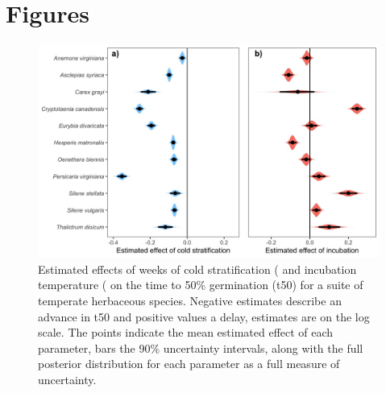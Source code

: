 \documentclass{article}[11pt]
\begin{document}
\section*{Figures}
\begin{figure}[h!]
    \centering
\includegraphics[width=\textwidth]{..//figure/mus_survival.jpeg}
   \caption{Estimated effects of weeks of cold stratification ( and incubation temperature ( on the time to 50\% germination (t50) for a suite of temperate herbaceous species. Negative estimates describe an advance in t50 and positive values a delay, estimates are on the log scale. The points indicate the mean estimated effect of each parameter, bars the  90\% uncertainty intervals, along with the full posterior distribution for each parameter as a full measure of uncertainty.} 
   \label{fig:musurv}
\end{figure}
\end{document}
